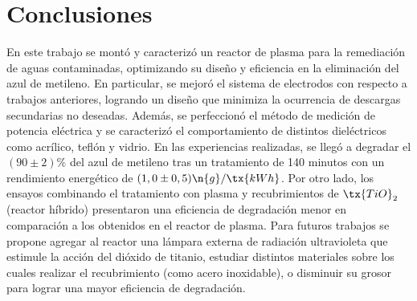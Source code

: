 
    \section{Conclusiones}
En este trabajo se montó y caracterizó un reactor de plasma para la remediación de aguas contaminadas, optimizando su diseño y eficiencia en la eliminación del azul de metileno. En particular, se mejoró el sistema de electrodos con respecto a trabajos anteriores, logrando un diseño que minimiza la ocurrencia de descargas secundarias no deseadas. Además, se perfeccionó el método de medición de potencia eléctrica y se caracterizó el comportamiento de distintos dieléctricos como acrílico, teflón y vidrio. En las experiencias realizadas, se llegó a degradar el $(90 \pm 2) \%$ del azul de metileno tras un tratamiento de 140 minutos con un rendimiento energético de $(1,0 \pm 0,5) \n{g}/\tx{kWh}$. Por otro lado, los ensayos combinando el tratamiento con plasma y recubrimientos de $\tx{TiO}_2$ (reactor híbrido) presentaron una eficiencia de degradación menor en comparación a los obtenidos en el reactor de plasma. Para futuros trabajos se propone agregar al reactor una lámpara externa de radiación ultravioleta que estimule la acción del dióxido de titanio, estudiar distintos materiales sobre los cuales realizar el recubrimiento (como acero inoxidable), o disminuir su grosor para lograr una mayor eficiencia de degradación.
